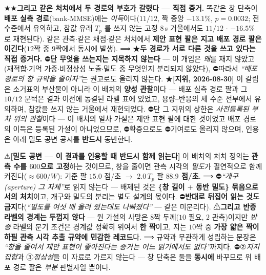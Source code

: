 \documentclass[11pt]{report}
\numberwithin{equation}{chapter}
\numberwithin{figure}{chapter}
\numberwithin{table}{chapter}
\begin{document}
★★\textbf{그리고 같은 처치에서 두 경로의 부호가 갈렸다 --- 직접 증거.} 똑같은 창 단축이
\textbf{배포 실측 경로}(bank-MMSE)에는 \emph{이득}이다($11/12$, 짝 중앙 $-13.1\%$,
$p = 0.0032$; 전 수준에서 유의하고, 참값 유래 $T_p$ 를 쓰지 않는 고정 $8$\,s 거울에서도
$11/12$ $\cdot$ $-16.5\%$ 로 재현된다). 같은 관측$\cdot$같은 채점$\cdot$같은 처치에서
\textbf{제안 표현 팔은 지고 배포 경로 팔은 이긴다}($12$짝 중 $9$짝에서 동시에 발생).
⟹ ★\textbf{두 경로가 서로 다른 것을 쓰고 있다는 직접 증거다.}
⛔\textbf{단 무엇을 쓰는지는 지목하지 않는다} --- 이 개입은 \emph{왜}를 재지 않았고
(재적합$\cdot$기억 가중$\cdot$비정상성 노출$\cdot$밀도 중 무엇인지 분리되지 않았다),
⛔따라서 \emph{``배포 경로의 창 규약을 줄이자''}는 권고로도 올리지 않는다.
★\textbf{[지위, 2026-08-30]} 이 갈림은 소거표의 부산물이 아니라 이 배치의 \textbf{양성
관찰}이다 --- 배포 실측 경로 팔과 그 $10/12$ 문턱은 결과 이전에 동결된 라벨 표에 있었고,
용량--반응의 세 수준 전부에서 유의하며, 참값을 쓰지 않는 거울에서 재현되었다.
⛔단 그 지위의 상한은 \emph{사전등록된 부차 위의 관찰}이다 --- 이 배치의 일차 가설은 제안
표현 팔에 대한 것이었고 배포 경로의 이득은 등록된 가설이 아니었으므로, ⛔확증으로도
⛔기여로도 올리지 않으며, 인용은 아래 밀도 공변 공시를 \textbf{반드시} 동반한다.

⚠\textbf{[밀도 공변 --- 이 결과를 인용할 때 반드시 함께 읽는다]} 이 배치의 처치 정의는
\textbf{관측 수를 $600$으로 고정}하는 것이므로, 창을 줄이면 관측 시각의 \emph{밀도}가
필연적으로 함께 커진다($\approx 600/W$): 기준 팔 $15.0$ 점/초 $\to$ $2.0\,T_p$ 팔
\textbf{$88.9$ 점/초}. ⟹ ⛔\emph{``개구(aperture) 그 자체''}로 읽지 않는다 --- 배제된 것은
\textbf{\{창 길이 $+$ 동반 밀도\} 묶음으로서의 처치}이고, 개구와 밀도의 분리는 별도
설계의 몫이다. ⛔\textbf{반대로 뒤집어 읽는 것도 금지}다(\emph{``밀도를 여섯 배 올려
줬는데도 나빠졌다''} --- 같은 미분리다). ⚠\textbf{그리고 반증 라벨의 경계는 두껍지 않다}
--- 원 가설의 사망은 $8$짝 두께($10$ 필요, $2$ 관측)이지만 \emph{반증} 라벨의 분기 조건은
경계값 정확히 위여서 \textbf{한 짝}이고, 지는 $10$짝 중 \textbf{가장 얇은 짝이 하필
관측 시각 추출 규약에 민감한 레코드}다. ⟹ 규약과 무관하게 성립하는 문장은
\emph{``창을 줄여서 제안 표현이 좋아진다는 증거는 어느 읽기에서도 없다''}까지다.
⛔②\emph{지지집합}과 ③\emph{정상성}을 이 자료로 가르지 않는다 --- 창 단축은 둘을
\textbf{동시에} 바꾸므로 위 배포 경로 팔은 \emph{부분} 판별자일 뿐이다.
\end{document}
